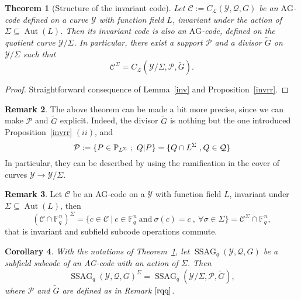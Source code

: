\documentclass[10pt]{article}
\newtheorem{thm}{Theorem}
\newtheorem{coro1}[thm]{Corollary}
\theoremstyle{definition}
\newtheorem{rq1}[thm]{Remark}
\theoremstyle{definition}
\theoremstyle{definition}
\newcommand{\s}{\vspace{0.3cm}}
\newcommand{\PP}{\mathbb{P}}
\newcommand{\fq}{\mathbb{F}_q}
\newcommand{\su}{\subseteq}
\newcommand{\Y}{\mathcal{Y}}
\newcommand{\PR}{\mathcal{P}}
\newcommand{\QR}{\mathcal{Q}}
\newcommand{\Aut}{\operatorname{Aut}}
\newcommand{\ssag}{\operatorname{SSAG}}
\newcommand{\calL}{\mathcal{L}}
\begin{document}
\begin{thm} [Structure of the invariant code] \label{invstruct}
Let $\mathcal{C} := C_{\calL}(\Y,\QR,G)$ be an $\mathrm{AG}$-code defined on a curve $\Y$ with function field $L$, invariant under the action of $\Sigma \su \Aut(L)$. Then its invariant code is also an $\mathrm{AG}$-code, defined on the quotient curve $\Y/\Sigma$. In particular, there exist a support $\PR$ and a divisor $\tilde{G}$ on $\Y/\Sigma$ such that
\[\mathcal{C}^{\Sigma} = C_{\calL}(\Y/\Sigma,\PR,\tilde{G}).\]
\end{thm}

\s
 
\begin{proof}
Straightforward consequence of Lemma~\ref{inv} and Proposition~\ref{invrr}.
\end{proof}

\s


\begin{rq1} \label{rqq}
The above theorem can be made a bit more precise, since we can make $\PR$ and $\tilde{G}$ explicit. Indeed, the divisor $\tilde{G}$ is nothing but the one introduced  Proposition~\ref{invrr} $(ii)$, and \[\PR := \\ \{P \in \PP_{L^{\Sigma}} \ ; \ Q|P\} = \{Q \cap L^{\Sigma} \ , Q \in \QR\} \] In particular, they can be described by using the ramification in the cover of curves $\Y \longrightarrow \Y/\Sigma$.
\end{rq1}

\s

\begin{rq1} \label{commute}
Let $\mathcal{C}$ be an AG-code on a $\Y$ with function field $L$, invariant under $\Sigma \su \Aut(L)$, then
\[(\mathcal{C}\cap \fq^n)^{\Sigma} = \{c \in \mathcal{C} \ | \ c \in \fq^n \ \textrm{and} \ \sigma(c)=c \ , \ \forall \sigma \in \Sigma\} = \mathcal{C}^{\Sigma} \cap \fq^n,\]
that is invariant and subfield subcode operations commute.
\end{rq1}

\s

\begin{coro1} \label{ssag}
With the notations of Theorem~\ref{invstruct}, let $\ssag_q(\Y,\QR,G)$ be a subfield subcode of an AG-code with an action of $\Sigma$. Then 
\[\ssag_q(\Y,\QR,G)^{\Sigma} = \ssag_q(\Y/\Sigma,\PR,\tilde{G}),\]
where $\PR$ and $\tilde{G}$ are defined as in Remark $\ref{rqq}$.
\end{coro1}

\s
\end{document}
